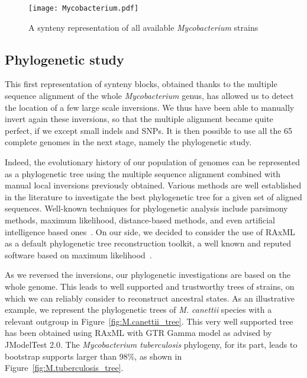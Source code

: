\documentclass[runningheads,a4paper]{llncs}
\begin{document}
\begin{figure}[!htb]
\centering
\texttt{[image: Mycobacterium.pdf]}
\caption{A synteny representation of all available \textit{Mycobacterium} strains} 
\label{fig:Mycobacterium_1}
\end{figure}

\subsection{Phylogenetic study}

This first representation of synteny blocks, obtained thanks to the multiple sequence alignment of the whole \textit{Mycobacterium} genus, has allowed us to detect the location of a few large scale inversions. We thus have been able to manually invert again these inversions, so that the multiple alignment became quite perfect, if we except small indels and SNPs. It is then possible to use all the 65 complete genomes in the next stage, namely the phylogenetic study.

Indeed, the evolutionary history of our population of genomes can be represented as a 
phylogenetic tree using the multiple sequence alignment combined with manual 
local inversions previously obtained.  %
Various methods are well established in the literature to investigate the best phylogenetic tree for a given set of aligned sequences. 
Well-known techniques for phylogenetic analysis include parsimony methods, maximum likelihood, distance-based methods, and even artificial intelligence based ones~\cite{agcs+15:oip, alkindy2015binary}.
On our side, we decided to consider the use of RAxML as a default phylogenetic tree reconstruction toolkit, a well known and reputed software based on maximum likelihood~\cite{alkindy2014hybrid,stamatakis2014raxml}.



As we reversed the inversions, our phylogenetic investigations are based on the whole genome.
This leads to well supported and trustworthy trees of strains, on which we can reliably consider to reconstruct ancestral states. As an illustrative example, we represent the phylogenetic trees of \textit{M. canettii} species with a relevant outgroup in Figure~\ref{fig:M.canettii_tree}. 
This very well supported tree has been obtained using RAxML  with GTR Gamma model as advised by JModelTest 2.0.
The \textit{Mycobacterium tuberculosis} phylogeny, for its part, leads to bootstrap supports larger than 98\%, as shown in Figure~\ref{fig:M.tuberculosis_tree}.
\end{document}
